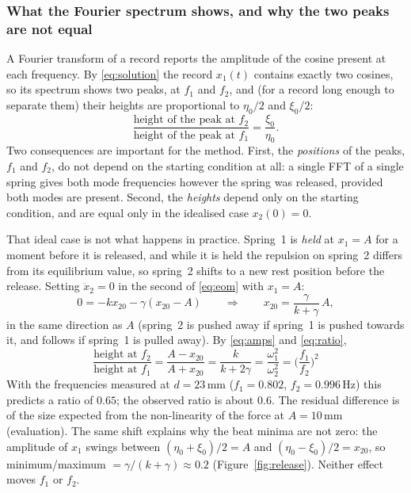 \documentclass[11pt,a4paper]{article}
\newcommand{\un}[1]{\,\mathrm{#1}}
\begin{document}
\subsubsection{What the Fourier spectrum shows, and why the two peaks are not equal}

A Fourier transform of a record reports the amplitude of the cosine present at each frequency. By \eqref{eq:solution} the record $x_1(t)$ contains exactly two cosines, so its spectrum shows two peaks, at $f_1$ and $f_2$, and (for a record long enough to separate them) their heights are proportional to $\eta_0/2$ and $\xi_0/2$:
\begin{equation}
\frac{\text{height of the peak at }f_2}{\text{height of the peak at }f_1}=\frac{\xi_0}{\eta_0}.
\label{eq:ratio}
\end{equation}
Two consequences are important for the method. First, the \emph{positions} of the peaks, $f_1$ and $f_2$, do not depend on the starting condition at all: a single FFT of a single spring gives both mode frequencies however the spring was released, provided both modes are present. Second, the \emph{heights} depend only on the starting condition, and are equal only in the idealised case $x_2(0)=0$.

That ideal case is not what happens in practice. Spring~1 is \emph{held} at $x_1=A$ for a moment before it is released, and while it is held the repulsion on spring~2 differs from its equilibrium value, so spring~2 shifts to a new rest position before the release. Setting $\ddot x_2=0$ in the second of \eqref{eq:eom} with $x_1=A$:
\begin{equation}
0=-kx_{20}-\gamma(x_{20}-A)\qquad\Longrightarrow\qquad x_{20}=\frac{\gamma}{k+\gamma}\,A ,
\end{equation}
in the same direction as $A$ (spring~2 is pushed away if spring~1 is pushed towards it, and follows if spring~1 is pulled away). By \eqref{eq:amps} and \eqref{eq:ratio},
\begin{equation}
\boxed{\;\frac{\text{height at }f_2}{\text{height at }f_1}=\frac{A-x_{20}}{A+x_{20}}=\frac{k}{k+2\gamma}=\frac{\omega_1^2}{\omega_2^2}=\Big(\frac{f_1}{f_2}\Big)^2\;}
\label{eq:heights}
\end{equation}
With the frequencies measured at $d=23\un{mm}$ ($f_1=0.802$, $f_2=0.996\un{Hz}$) this predicts a ratio of $0.65$; the observed ratio is about $0.6$. The residual difference is of the size expected from the non-linearity of the force at $A=10\un{mm}$ (evaluation). The same shift explains why the beat minima are not zero: the amplitude of $x_1$ swings between $(\eta_0+\xi_0)/2=A$ and $(\eta_0-\xi_0)/2=x_{20}$, so minimum/maximum $=\gamma/(k+\gamma)\approx0.2$ (Figure~\ref{fig:release}). Neither effect moves $f_1$ or $f_2$.
\end{document}

